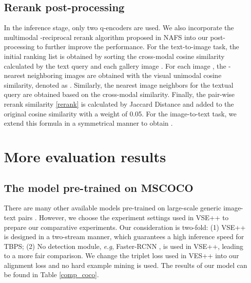 \documentclass{bmvc2k}
\def\eg{\emph{e.g}\bmvaOneDot}
\begin{document}
\subsection{Rerank post-processing} In the inference stage, only two q-encoders are used. We also incorporate the multimodal -reciprocal rerank algorithm proposed in NAFS \cite{gao2021contextual} into our post-processing to further improve the performance. For the text-to-image task, the initial ranking list is obtained by sorting the cross-modal cosine similarity calculated by the text query  and each gallery image . For each image , the -nearest neighboring images are obtained with the visual unimodal cosine similarity, denoted as . Similarly, the nearest image neighbors for the textual query  are obtained based on the cross-modal similarity. Finally, the pair-wise rerank similarity  \ref{rerank} is calculated by Jaccard Distance and added to the original cosine similarity with a weight of 0.05. For the image-to-text task, we extend this formula in a symmetrical manner to obtain .


\section{More evaluation results}
\subsection{The model pre-trained on MSCOCO}
There are many other available models \cite{lu2019vilbert,tan2019lxmert,li2020oscar,chen2020uniter} pre-trained on large-scale generic image-text pairs \cite{lin2014coco,plummer2015flickr30k}. However, we choose the experiment settings used in VSE++ \cite{vaghri2019vsepp} to prepare our comparative experiments. Our consideration is two-fold: (1) VSE++ is designed in a two-stream manner, which guarantees a high inference speed for TBPS; (2) No detection module, \eg, Faster-RCNN \cite{ren2016faster}, is used in VSE++, leading to a more fair comparison. We change the triplet loss used in VES++ into our alignment loss and no hard example mining is used. The results of our model can be found in Table \ref{comp_coco}.
\end{document}
